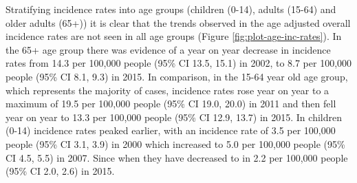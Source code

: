 \documentclass[11pt,twoside]{bristolthesis}
\begin{document}
  Stratifying incidence rates into age groups (children (0-14), adults (15-64) and older adults (65+)) it is clear that the trends observed in the age adjusted overall incidence rates are not seen in all age groups (Figure \ref{fig:plot-age-inc-rates}). In the 65+ age group there was evidence of a year on year decrease in incidence rates from 14.3 per 100,000 people (95\% CI 13.5, 15.1) in 2002, to 8.7 per 100,000 people (95\% CI 8.1, 9.3) in 2015. In comparison, in the 15-64 year old age group, which represents the majority of cases, incidence rates rose year on year to a maximum of 19.5 per 100,000 people (95\% CI 19.0, 20.0) in 2011 and then fell year on year to 13.3 per 100,000 people (95\% CI 12.9, 13.7) in 2015. In children (0-14) incidence rates peaked earlier, with an incidence rate of 3.5 per 100,000 people (95\% CI 3.1, 3.9) in 2000 which increased to 5.0 per 100,000 people (95\% CI 4.5, 5.5) in 2007. Since when they have decreased to in 2.2 per 100,000 people (95\% CI 2.0, 2.6) in 2015.
  
\end{document}
